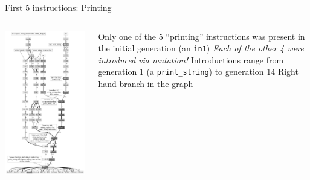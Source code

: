 \documentclass{beamer}
\newcommand{\linespace}{\vskip 0.25cm}
\begin{document}
\begin{frame}{First 5 instructions: Printing}
	
	\begin{columns}
		\begin{column}{0.4 \linewidth}
			\centering
			\includegraphics[height = 0.8 \textheight]{../../figures/filtered_fill.pdf}
		\end{column}
		
		\begin{column}{0.6 \linewidth}
			Only one of the 5 ``printing'' instructions was present in the initial generation (an \texttt{in1})
			\linespace
			\emph{Each of the other 4 were introduced via mutation!}
			\linespace
			Introductions range from generation 1 (a \texttt{print\_string}) to generation 14
			\linespace
			Right hand branch in the graph
		\end{column}
	\end{columns}
\end{frame}
\end{document}
